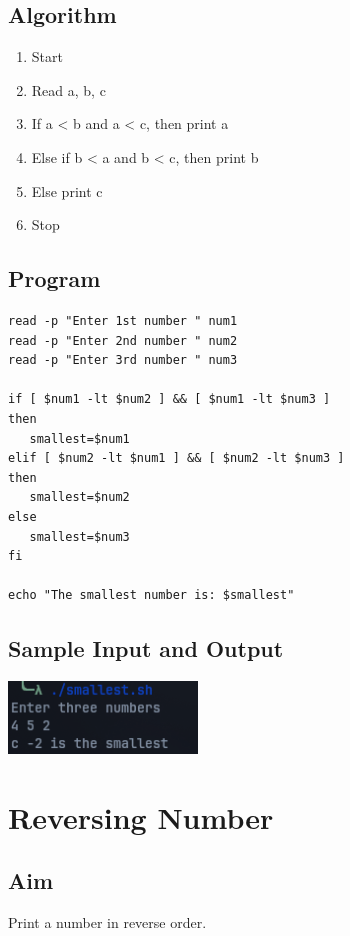 \subsection{Algorithm}
\begin{enumerate}
   \item Start
   \item Read a, b, c
   \item If a < b and a < c, then print a
   \item Else if b < a and b < c, then print b
   \item Else print c
   \item Stop
\end{enumerate}

\subsection{Program}
\begin{lstlisting}[label={list:program:smallest_three}]
read -p "Enter 1st number " num1
read -p "Enter 2nd number " num2
read -p "Enter 3rd number " num3

if [ $num1 -lt $num2 ] && [ $num1 -lt $num3 ]
then
   smallest=$num1
elif [ $num2 -lt $num1 ] && [ $num2 -lt $num3 ]
then
   smallest=$num2
else
   smallest=$num3
fi

echo "The smallest number is: $smallest"
\end{lstlisting}

\subsection{Sample Input and Output}
\includegraphics[]{Cycle_1//Outputs/smallest.png}

\section{Reversing Number}

\subsection{Aim}
Print a number in reverse order.


